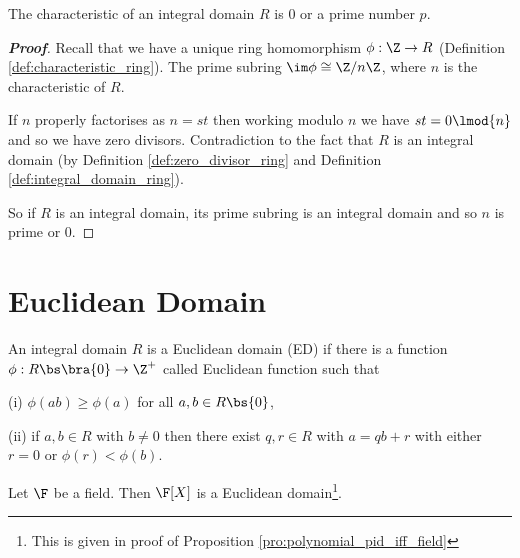\begin{lemma}
The characteristic of an integral domain $R$ is 0 or a prime number $p$.
\end{lemma}

\begin{proof}[\bf Proof]
Recall that we have a unique ring homomorphism $\phi: \Z \to R$ (Definition \ref{def:characteristic_ring}). The prime subring $\im \phi \cong \Z/n\Z$, where $n$ is the characteristic of $R$.

If $n$ properly factorises as $n = st$ then working modulo $n$ we have $st = 0 \lmod{n}$ and so we have zero divisors. Contradiction to the fact that $R$ is an integral domain (by Definition \ref{def:zero_divisor_ring} and Definition \ref{def:integral_domain_ring}).

So if $R$ is an integral domain, its prime subring is an integral domain and so $n$ is prime or 0.
\end{proof}



\section{Euclidean Domain}%


\begin{definition}\label{def:euclidean_domain}
An integral domain $R$ is a Euclidean domain (ED) if there is a function $\phi: R \bs\bra{0} \to \Z^+$ called Euclidean function such that
\ben
\item [(i)] $\phi(ab) \geq \phi(a)$ for all $a, b \in R \bs \{0\}$,
\item [(ii)] if $a, b \in R$ with $b \neq 0$ then there exist $q, r \in R$ with $a = qb + r$ with either $r = 0$ or $\phi(r) < \phi(b)$.
\een
\end{definition}

\begin{proposition}
Let $\F$ be a field. Then $\F[X]$ is a Euclidean domain\footnote{This is given in proof of Proposition \ref{pro:polynomial_pid_iff_field}}. %
\end{proposition}

